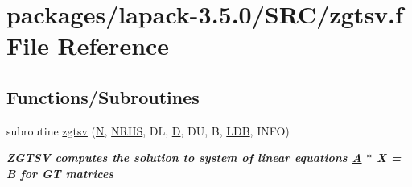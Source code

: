 \hypertarget{zgtsv_8f}{}\section{packages/lapack-\/3.5.0/\+S\+R\+C/zgtsv.f File Reference}
\label{zgtsv_8f}
\subsection*{Functions/\+Subroutines}
\begin{DoxyCompactItemize}
\item 
subroutine \hyperlink{group__complex16GTsolve_gafa718af2b9ce6eca26d8dd1cbfc3cedf}{zgtsv} (\hyperlink{polmisc_8c_a0240ac851181b84ac374872dc5434ee4}{N}, \hyperlink{example__user_8c_aa0138da002ce2a90360df2f521eb3198}{N\+R\+H\+S}, D\+L, \hyperlink{odrpack_8h_a7dae6ea403d00f3687f24a874e67d139}{D}, D\+U, B, \hyperlink{example__user_8c_a50e90a7104df172b5a89a06c47fcca04}{L\+D\+B}, I\+N\+F\+O)
\begin{DoxyCompactList}\small\item\em {\bfseries  Z\+G\+T\+S\+V computes the solution to system of linear equations \hyperlink{classA}{A} $\ast$ X = B for G\+T matrices {\bfseries  }}\end{DoxyCompactList}\end{DoxyCompactItemize}
